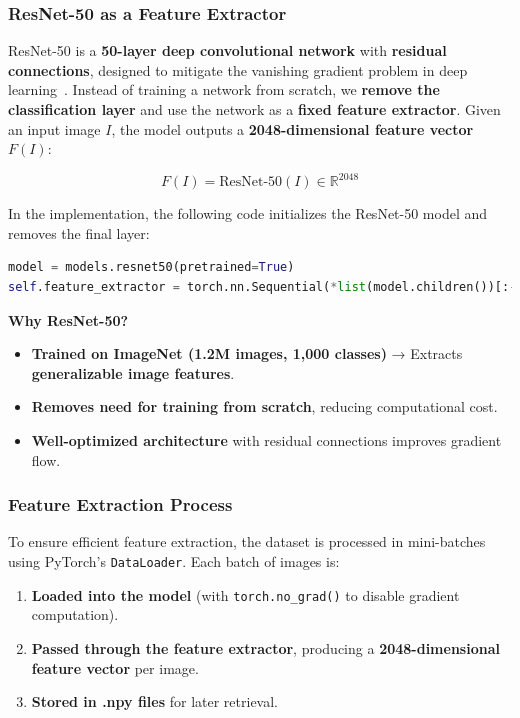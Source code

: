 \documentclass[nolibertine, english, algorithm, nomencl, minted]{ttlab-qualify}
\begin{document}
\subsubsection{ResNet-50 as a Feature Extractor}
ResNet-50 is a \textbf{50-layer deep convolutional network} with \textbf{residual connections}, 
designed to mitigate the vanishing gradient problem in deep learning~\parencite{he2016resnet}. 
Instead of training a network from scratch, we \textbf{remove the classification layer} and use the network 
as a \textbf{fixed feature extractor}. 
Given an input image \( I \), the model outputs a \textbf{2048-dimensional feature vector} \( F(I) \):

\begin{equation}
F(I) = \text{ResNet-50}(I) \in \mathbb{R}^{2048}
\end{equation}

In the implementation, the following code initializes the ResNet-50 model and removes the final layer:

\begin{footnotesize}
\begin{lstlisting}[language=Python, frame=single, breaklines=true]
model = models.resnet50(pretrained=True)
self.feature_extractor = torch.nn.Sequential(*list(model.children())[:-1])  # Remove FC layer
\end{lstlisting}
\end{footnotesize}

\noindent
\textbf{Why ResNet-50?}
\begin{itemize}
    \item \textbf{Trained on ImageNet (1.2M images, 1,000 classes)} → Extracts \textbf{generalizable image features}.
    \item \textbf{Removes need for training from scratch}, reducing computational cost.
    \item \textbf{Well-optimized architecture} with residual connections improves gradient flow.
\end{itemize}

\subsubsection{Feature Extraction Process}
To ensure efficient feature extraction, the dataset is processed in mini-batches 
using PyTorch’s \texttt{DataLoader}. Each batch of images is:
\begin{enumerate}
    \item \textbf{Loaded into the model} (with \texttt{torch.no\_grad()} to disable gradient computation).
    \item \textbf{Passed through the feature extractor}, producing a \textbf{2048-dimensional feature vector} per image.
    \item \textbf{Stored in .npy files} for later retrieval.
\end{enumerate}
\end{document}
